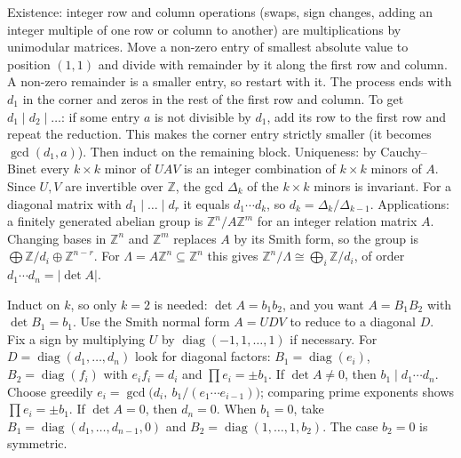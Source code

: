 \documentclass[11pt,a4paper]{article}
\begin{document}

Existence: integer row and column operations (swaps, sign changes, adding an integer multiple of one row or column to another) are multiplications by unimodular matrices. Move a non-zero entry of smallest absolute value to position \((1,1)\) and divide with remainder by it along the first row and column. A non-zero remainder is a smaller entry, so restart with it. The process ends with \(d_1\) in the corner and zeros in the rest of the first row and column.
To get \(d_1\mid d_2\mid\dots\): if some entry \(a\) is not divisible by \(d_1\), add its row to the first row and repeat the reduction. This makes the corner entry strictly smaller (it becomes \(\gcd(d_1,a)\)). Then induct on the remaining block.
Uniqueness: by Cauchy--Binet every \(k\times k\) minor of \(UAV\) is an integer combination of \(k\times k\) minors of \(A\). Since \(U,V\) are invertible over \(\mathbb Z\), the gcd \(\Delta_k\) of the \(k\times k\) minors is invariant. For a diagonal matrix with \(d_1\mid\dots\mid d_r\) it equals \(d_1\cdots d_k\), so \(d_k=\Delta_k/\Delta_{k-1}\).
Applications: a finitely generated abelian group is \(\mathbb Z^n/A\mathbb Z^m\) for an integer relation matrix \(A\). Changing bases in \(\mathbb Z^n\) and \(\mathbb Z^m\) replaces \(A\) by its Smith form, so the group is \(\bigoplus\mathbb Z/d_i\oplus\mathbb Z^{n-r}\). For \(\Lambda=A\mathbb Z^n\subseteq\mathbb Z^n\) this gives \(\mathbb Z^n/\Lambda\cong\bigoplus_i\mathbb Z/d_i\), of order \(d_1\cdots d_n=|\det A|\).

Induct on \(k\), so only \(k=2\) is needed: \(\det A=b_1b_2\), and you want \(A=B_1B_2\) with \(\det B_1=b_1\). Use the Smith normal form \(A=UDV\) to reduce to a diagonal \(D\). Fix a sign by multiplying \(U\) by \(\operatorname{diag}(-1,1,\dots,1)\) if necessary.
For \(D=\operatorname{diag}(d_1,\dots,d_n)\) look for diagonal factors: \(B_1=\operatorname{diag}(e_i)\), \(B_2=\operatorname{diag}(f_i)\) with \(e_if_i=d_i\) and \(\prod e_i=\pm b_1\).
If \(\det A\ne0\), then \(b_1\mid d_1\cdots d_n\). Choose greedily \(e_i=\gcd\bigl(d_i,\ b_1/(e_1\cdots e_{i-1})\bigr)\); comparing prime exponents shows \(\prod e_i=\pm b_1\). If \(\det A=0\), then \(d_n=0\). When \(b_1=0\), take \(B_1=\operatorname{diag}(d_1,\dots,d_{n-1},0)\) and \(B_2=\operatorname{diag}(1,\dots,1,b_2)\). The case \(b_2=0\) is symmetric.
\end{document}
